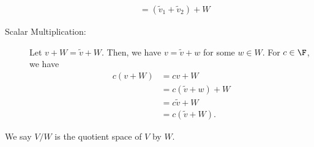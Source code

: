 \documentclass[10pt]{mypackage}
\begin{document}
\begin{definition}
\begin{description}
\begin{align*}
                                                    &= \left(\tilde{v}_1 + \tilde{v}_2\right) + W
      \end{align*}
    \item[Scalar Multiplication:] Let $v + W = \tilde{v} + W$. Then, we have $v = \tilde{v} + w$ for some $w\in W$. For $c\in\F$, we have
      \begin{align*}
        c\left(v + W\right) &= cv + W\\
                            &= c\left(\tilde{v} + w\right) + W\\
                            &= c\tilde{v} + W\\
                            &= c\left(\tilde{v} + W\right).
      \end{align*}
  \end{description}
  We say $V/W$ is the quotient space of $V$ by $W$.
\end{definition}
\end{document}
